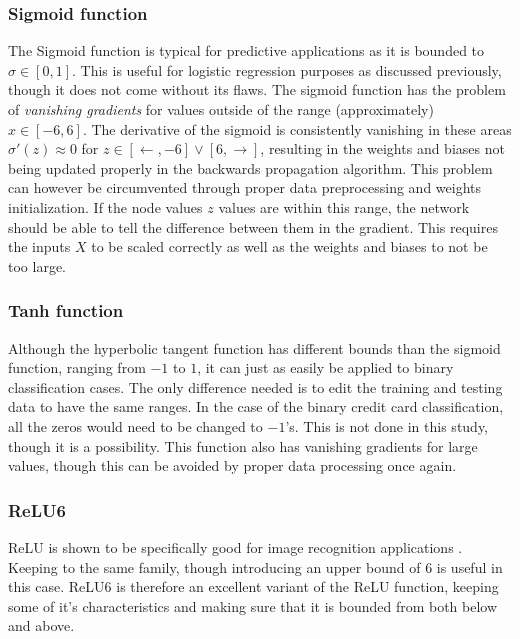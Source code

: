         \subsubsection{Sigmoid function}     %
            The Sigmoid function is typical for predictive applications as it is bounded to $\sigma \in [0,1]$. This is useful for logistic regression purposes as discussed previously, though it does not come without its flaws. The sigmoid function has the problem of \textit{vanishing gradients} for values outside of the range (approximately) $x \in [-6,6]$. The derivative of the sigmoid is consistently vanishing in these areas $\sigma'(z)\approx 0$ for $z\in [\leftarrow, -6]\vee[6, \rightarrow]$, resulting in the weights and biases not being updated properly in the backwards propagation algorithm. This problem can however be circumvented through proper data preprocessing and weights initialization. If the node values $z$ values are within this range, the network should be able to tell the difference between them in the gradient. This requires the inputs $X$ to be scaled correctly as well as the weights and biases to not be too large.
        \subsubsection{Tanh function}
            Although the hyperbolic tangent function has different bounds than the sigmoid function, ranging from $-1$ to $1$, it can just as easily be applied to binary classification cases. The only difference needed is to edit the %
            training and testing data to have the same ranges. In the case of the binary credit card classification, all the zeros %
            would need to be changed to $-1$'s. This is not done in this study, though it is a possibility. This function also has vanishing gradients for large values, though this can be avoided by proper data processing once again. 
        \subsubsection{ReLU6}        %
            ReLU is shown to be specifically good for image recognition applications \cite{ReLUImagenet}. Keeping to the same family, though introducing an upper bound of $6$ is useful in this case. ReLU6 is therefore an excellent variant of the ReLU function, keeping some of it's characteristics and making sure that it is bounded from both below and above.
        
